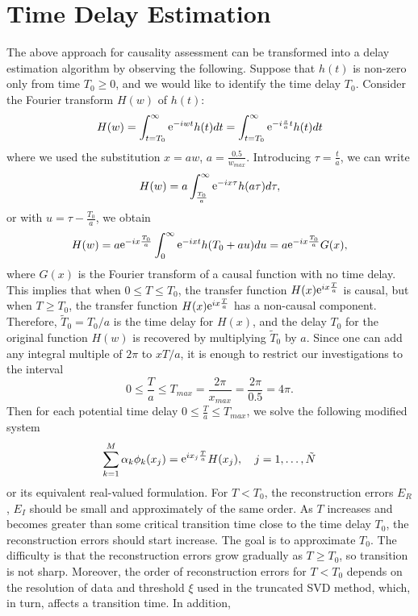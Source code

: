 \documentclass[journal,twoside]{IEEEtran}
\begin{document}
 
\section{Time Delay Estimation} \label{delay_estimation}

The above approach for causality assessment can be transformed into a delay estimation algorithm by observing the following. Suppose that $h(t)$ is non-zero only from time $T_0\geq 0$, and we would like to identify the time delay $T_0$. Consider the Fourier transform $H(w)$ of $h(t)$:
\[
H(w)=\int_{t=T_0}^\infty {\mathop{\rm e}\nolimits}^{-iwt} h(t) dt=\int_{t=T_0}^\infty {\mathop{\rm e}\nolimits}^{-i\frac x a t} h(t) dt
\]
where we used the substitution $x=aw$, $a=\frac{0.5}{w_{max}}$. Introducing $\tau=\frac ta$, we can write
\[
H(w)=a \int_{\frac{T_0}{a}}^\infty {\mathop{\rm e}\nolimits}^{-ix\tau} h(a\tau) d\tau,
\]
or with $u=\tau-\frac{T_0}{a}$, we obtain
\[
H(w)=a {\mathop{\rm e}\nolimits}^{-ix\frac{T_0}{a}} \int_0^\infty {\mathop{\rm e}\nolimits}^{-ixt} h(T_0+au) du = a {\mathop{\rm e}\nolimits}^{-ix\frac{T_0}{a}}  G(x),
\]
where $G(x)$ is the Fourier transform of a causal function with no time delay.  This implies that when $0\leq T \leq {T_0}$, the transfer function $H(x){\mathop{\rm e}\nolimits}^{ix\frac Ta}$ is causal, but when $T\geq {T_0}$, the transfer function $H(x){\mathop{\rm e}\nolimits}^{ix\frac Ta}$ has a non-causal component. Therefore, $\tilde T_0={T_0}/a$ is the time delay for $H(x)$, and the delay $T_0$ for the original function $H(w)$ is recovered by multiplying $\tilde T_0$ by $a$. Since one can add any integral multiple of $2\pi$ to $xT/a$, it is enough to restrict our investigations to the interval
\[
0\leq \frac Ta \leq T_{max}=\frac{2\pi}{x_{max}}=\frac{2\pi}{0.5}=4\pi.
\]
Then for each potential time delay $0\leq \frac Ta\leq T_{max}$, we solve the following modified system
\begin{equation} \label{ED3}
\sum_{k=1}^{M}  \alpha_k \phi_k(x_j)={\mathop{\rm e}\nolimits}^{ix_j\frac Ta}H(x_j), \quad j=1,\ldots,\tilde N
\end{equation}
or its equivalent real-valued formulation.
For $T< T_0$, the reconstruction errors $E_R$, $E_I$ should be small and approximately of the same order. As $T$ increases and becomes greater than some critical transition time close to the time delay $ T_0$, the reconstruction errors should start increase. 
The goal is to approximate $T_0$. The difficulty is that the reconstruction errors grow gradually as $T\geq  T_0$, so transition is not sharp. Moreover, the order of reconstruction errors for $T<  T_0$ depends on the resolution of data and threshold $\xi$ used in the truncated SVD method, which, in turn, affects a transition time. In addition, 
\end{document}

